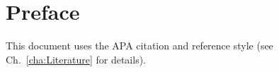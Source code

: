 \chapter{Preface}

This document uses the APA citation and reference style (see Ch.\ \ref{cha:Literature} for details).




